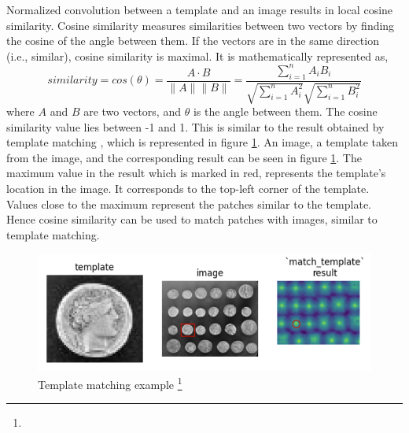 \documentclass[fleqn,10pt]{wlscirep}
\begin{document}
	Normalized convolution between a template and an image results in local cosine similarity. Cosine similarity  measures similarities between two vectors\cite{alake_understanding_2021} by finding the cosine of the angle between them. If the vectors are in the same direction (i.e., similar), cosine similarity is maximal. It is mathematically represented as,
	\begin{equation}
		similarity = cos(\theta) = \frac{A\cdot B}{\|A\|\|B\|} = \frac{\sum_{i=1}^{n}A_i B_i}{\sqrt{\sum_{i=1}^{n}A_i^2}\sqrt{\sum_{i=1}^{n}B_i^2}}
	\end{equation}
	where $A$ and $B$ are two vectors, and $\theta$ is the angle between them. The cosine similarity value lies between -1 and 1. This is similar to the result obtained by template matching , which is represented in figure \ref{fig:template_matching}. An image, a template taken from the image, and the corresponding result can be seen in figure \ref{fig:template_matching}. The maximum value in the result which is marked in red, represents the template’s location in the image. It corresponds to the top-left corner of the template. Values close to the maximum represent the patches similar to the template. Hence cosine similarity can be used to match patches with images, similar to template matching.
	
	
	
	
	\begin{figure}
		\centering
		\includegraphics[scale=0.8]{./imgs/template_matching.png}
		\caption[Template matching example]{Template matching example \footnote{\footnotemark} }
		\label{fig:template_matching}
	\end{figure} 
	
\end{document}
